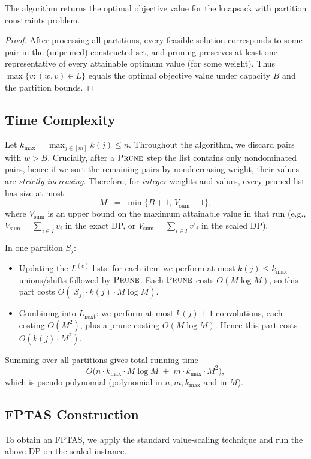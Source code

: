 \begin{theorem}
    The algorithm returns the optimal objective value for the knapsack with partition constraints problem.
\end{theorem}

\begin{proof}
    After processing all partitions, every feasible solution corresponds to some pair in the (unpruned) constructed set, and pruning preserves at least one representative of every attainable optimum value (for some weight). Thus $\max\{v:(w,v)\in L\}$ equals the optimal objective value under capacity $B$ and the partition bounds.
\end{proof}

\subsection*{Time Complexity}
Let $k_{\max}=\max_{j\in[m]} k(j)\le n$. Throughout the algorithm, we discard pairs with $w>B$.
Crucially, after a $\textsc{Prune}$ step the list contains only nondominated pairs, hence if we sort the remaining pairs by nondecreasing weight, their values are \emph{strictly increasing}. Therefore, for \emph{integer} weights and values, every pruned list has size at most
\[
M \;:=\; \min\{B+1,\,V_{\text{sum}}+1\},
\]
where $V_{\text{sum}}$ is an upper bound on the maximum attainable value in that run (e.g., $V_{\text{sum}}=\sum_{i\in I} v_i$ in the exact DP, or $V_{\text{sum}}=\sum_{i\in I} v'_i$ in the scaled DP).

In one partition $S_j$:
\begin{itemize}
    \item Updating the $L^{(c)}$ lists: for each item we perform at most $k(j)\le k_{\max}$ unions/shifts followed by $\textsc{Prune}$. Each $\textsc{Prune}$ costs $O(M\log M)$, so this part costs $O(|S_j|\cdot k(j)\cdot M\log M)$.
    \item Combining into $L_{\text{next}}$: we perform at most $k(j)+1$ convolutions, each costing $O(M^2)$, plus a prune costing $O(M\log M)$. Hence this part costs $O(k(j)\cdot M^2)$.
\end{itemize}
Summing over all partitions gives total running time
\[
O\Big(n\cdot k_{\max}\cdot M\log M \;+\; m\cdot k_{\max}\cdot M^2\Big),
\]
which is pseudo-polynomial (polynomial in $n,m,k_{\max}$ and in $M$).

\subsection*{FPTAS Construction}
To obtain an FPTAS, we apply the standard value-scaling technique and run the above DP on the scaled instance.

